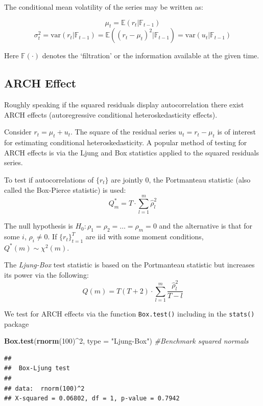\documentclass[11pt,]{article}
\newenvironment{Shaded}{\begin{snugshade}}{\end{snugshade}}
\newcommand{\KeywordTok}[1]{\textcolor[rgb]{0.13,0.29,0.53}{\textbf{#1}}}
\newcommand{\DataTypeTok}[1]{\textcolor[rgb]{0.13,0.29,0.53}{#1}}
\newcommand{\DecValTok}[1]{\textcolor[rgb]{0.00,0.00,0.81}{#1}}
\newcommand{\StringTok}[1]{\textcolor[rgb]{0.31,0.60,0.02}{#1}}
\newcommand{\CommentTok}[1]{\textcolor[rgb]{0.56,0.35,0.01}{\textit{#1}}}
\newcommand{\OperatorTok}[1]{\textcolor[rgb]{0.81,0.36,0.00}{\textbf{#1}}}
\newcommand{\NormalTok}[1]{#1}
\begin{document}
The conditional mean volatility of the series may be written as:

\[\mu_t = \mathbb{E}(r_t|\mathbb{F}_{t-1})\]
\[\sigma_t^2 = \text{var}(r_t|\mathbb{F}_{t-1}) = \mathbb{E}((r_t-\mu_t)^2|\mathbb{F}_{t-1})
=\text{var}(u_t|\mathbb{F}_{t-1})\]

Here \(\mathbb{F}(\cdot)\) denotes the `filtration' or the information
available at the given time.

\subsection{ARCH Effect}\label{arch-effect}

Roughly speaking if the squared residuals display autocorrelation there
exist ARCH effects (autoregressive conditional heteroskedasticity
effects).

Consider \(r_t = \mu_t + u_t\). The square of the residual series
\(u_t = r_t - \mu_t\) is of interest for estimating conditional
heteroskedasticity. A popular method of testing for ARCH effects is via
the Ljung and Box statistics applied to the squared residuals series.

To test if autocorrelations of \(\{r_t\}\) are jointly 0, the
Portmanteau statistic (also called the Box-Pierce statistic) is used:
\[Q^*_m = T\cdot\sum_{l=1}^m \hat{\rho}^2_l\]

The null hypothesis is \(H_0:\rho_1=\rho_2=\hdots=\rho_m=0\) and the
alternative is that for some \(i\), \(\rho_i\neq 0\). If
\(\{r_t\}_{t=1}^T\) are iid with some moment conditions,
\(Q^*(m)\sim\chi^2(m)\).

The \emph{Ljung-Box} test statistic is based on the Portmanteau
statistic but increases its power via the following:
\[Q(m)=T(T+2)\cdot\sum_{l=1}^m \frac{\hat{\rho}_l^2}{T-l}\]

We test for ARCH effects via the function \texttt{Box.test()} including
in the \texttt{stats()} package

\begin{Shaded}
\begin{Highlighting}[]
\KeywordTok{Box.test}\NormalTok{(}\KeywordTok{rnorm}\NormalTok{(}\DecValTok{100}\NormalTok{)}\OperatorTok{^}\DecValTok{2}\NormalTok{, }\DataTypeTok{type =} \StringTok{"Ljung-Box"}\NormalTok{) }\CommentTok{#Benchmark squared normals}
\end{Highlighting}
\end{Shaded}

\begin{verbatim}
## 
##  Box-Ljung test
## 
## data:  rnorm(100)^2
## X-squared = 0.06802, df = 1, p-value = 0.7942
\end{verbatim}
\end{document}
